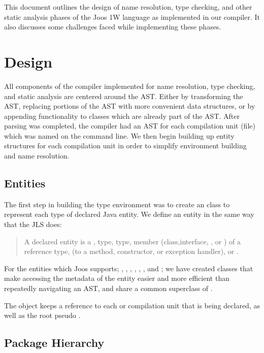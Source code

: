 \documentclass[pdftex,11pt,a4paper]{article}
\begin{document}

This document outlines the design of name resolution, type checking,
and other static analysis phases of the Joos 1W language as
implemented in our compiler. It also discusses some challenges faced
while implementing these phases.


\section{Design}

All components of the compiler implemented for name resolution, type
checking, and static analysis are centered around the AST. Either by
transforming the AST, replacing portions of the AST with more
convenient data structures, or by appending functionality to classes
which are already part of the AST. After parsing was completed, the
compiler had an AST for each compilation unit (file) which was named
on the command line. We then begin building up entity structures for
each compilation unit in order to simplify environment building
and name resolution.

\subsection{Entities}

The first step in building the type environment was to create an
 class to represent each type of declared Java entity. We
define an entity in the same way that the JLS does:

\begin{quote}
A declared entity is a ,  type,
 type, member (class,interface, , or
) of a reference type,  (to a method,
constructor, or exception handler), or .
\end{quote}

For the entities which Joos supports; , ,
, , , , and
; we have created classes that make accessing the
metadata of the entity easier and more efficient than repeatedly
navigating an AST, and share a common superclass of .

The  object keeps a reference to each  or
 compilation unit that is being declared, as well as
the root pseudo .

\subsection{Package Hierarchy}
\end{document}
